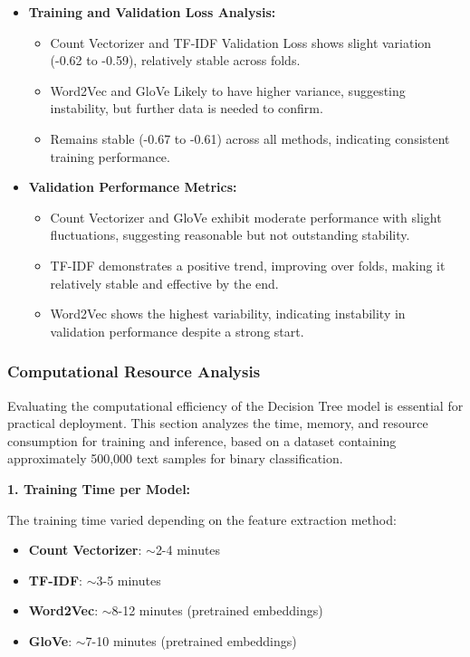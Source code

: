 \begin{itemize}
    \item \textbf{Training and Validation Loss Analysis:}
    \begin{itemize}
        \item Count Vectorizer and TF-IDF Validation Loss shows slight variation (-0.62 to -0.59), relatively stable across folds.
        \item Word2Vec and GloVe Likely to have higher variance, suggesting instability, but further data is needed to confirm.
        \item Remains stable (-0.67 to -0.61) across all methods, indicating consistent training performance.
    \end{itemize}
    
    \item \textbf{Validation Performance Metrics:}
    \begin{itemize}
        \item Count Vectorizer and GloVe exhibit moderate performance with slight fluctuations, suggesting reasonable but not outstanding stability.
        \item TF-IDF demonstrates a positive trend, improving over folds, making it relatively stable and effective by the end.
        \item Word2Vec shows the highest variability, indicating instability in validation performance despite a strong start.
    \end{itemize}
\end{itemize}

\subsubsection{Computational Resource Analysis}

Evaluating the computational efficiency of the Decision Tree model is essential for practical deployment. This section analyzes the time, memory, and resource consumption for training and inference, based on a dataset containing approximately 500,000 text samples for binary classification.

\textbf{1. Training Time per Model:}  

The training time varied depending on the feature extraction method:  
\begin{itemize}
    \item \textbf{Count Vectorizer}: $\sim$2-4 minutes  
    \item \textbf{TF-IDF}: $\sim$3-5 minutes  
    \item \textbf{Word2Vec}: $\sim$8-12 minutes (pretrained embeddings)  
    \item \textbf{GloVe}: $\sim$7-10 minutes (pretrained embeddings)  
\end{itemize}

